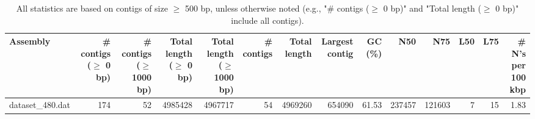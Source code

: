 \documentclass[12pt,a4paper]{article}
\begin{document}
\begin{table}[ht]
\begin{center}
\caption{All statistics are based on contigs of size $\geq$ 500 bp, unless otherwise noted (e.g., "\# contigs ($\geq$ 0 bp)" and "Total length ($\geq$ 0 bp)" include all contigs).}
\begin{tabular}{|l*{13}{|r}|}
\hline
Assembly & \# contigs ($\geq$ 0 bp) & \# contigs ($\geq$ 1000 bp) & Total length ($\geq$ 0 bp) & Total length ($\geq$ 1000 bp) & \# contigs & Total length & Largest contig & GC (\%) & N50 & N75 & L50 & L75 & \# N's per 100 kbp \\ \hline
dataset\_480.dat & 174 & 52 & 4985428 & 4967717 & 54 & 4969260 & 654090 & 61.53 & 237457 & 121603 & 7 & 15 & 1.83 \\ \hline
\end{tabular}
\end{center}
\end{table}
\end{document}
